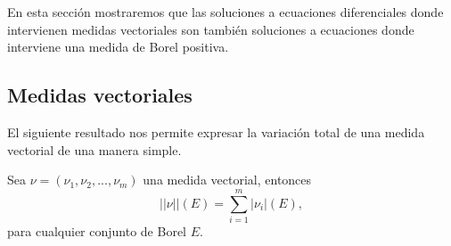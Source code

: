 En esta sección mostraremos que las soluciones a ecuaciones diferenciales donde intervienen medidas vectoriales son también soluciones a ecuaciones donde interviene una medida de Borel positiva.

\subsection{Medidas vectoriales}


El siguiente resultado nos permite expresar la variación total de una medida vectorial de una manera simple.
\begin{lem} \label{lem:medida vectorial}
    Sea $\nu=(\nu_1,\nu_2,...,\nu_m)$ una medida vectorial, entonces 
    \begin{equation}
        ||\nu||(E)=\sum_{i=1}^{m}|\nu_i|(E), 
\end{equation}\index[Simbolo]{$\Vert \nu \Vert$} para cualquier conjunto de Borel $E$.
\end{lem}
